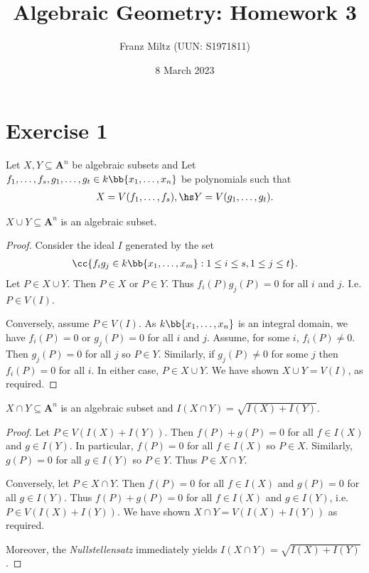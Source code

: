 \documentclass{article}
\begin{document}
\title{Algebraic Geometry: Homework 3}
\author{Franz Miltz (UUN: S1971811)}
\date{8 March 2023}
\maketitle

\section*{Exercise 1}

Let $X,Y\subseteq\mathbf A^n$ be algebraic subsets and
Let $f_1,\ldots,f_s,g_1,\ldots,g_t\in k\bb{x_1,\ldots,x_n}$ be polynomials such that
\begin{align*}
  X=V(f_1,\ldots,f_s), \hs
  Y=V(g_1,\ldots,g_t).
\end{align*}

\begin{claim*}[1]
  $X\cup Y\subseteq \mathbf A^n$ is an algebraic subset.
  \begin{proof}
    Consider the ideal $I$ generated by the set
    \begin{align*}
      \cc{f_i g_j \in k\bb{x_1,\ldots,x_m} : 1\leq i\leq s, 1\leq j\leq t}.
    \end{align*}
    Let $P\in X\cup Y$. Then $P\in X$ or $P\in Y$. Thus $f_i(P)g_j(P)=0$ for all
    $i$ and $j$. I.e. $P\in V(I)$.

    Conversely, assume $P\in V(I)$. As $k\bb{x_1,\ldots,x_n}$ is an integral domain,
    we have $f_i(P)=0$ or $g_j(P)=0$ for all $i$ and $j$. Assume, for some $i$,
    $f_i(P)\neq 0$. Then $g_j(P)=0$ for all $j$ so $P\in Y$. Similarly, if $g_j(P)\neq 0$
    for some $j$ then $f_i(P)=0$ for all $i$. In either case, $P\in X\cup Y$. We
    have shown $X\cup Y=V(I)$, as required.
  \end{proof}
\end{claim*}

\begin{claim*}[2]
  $X\cap Y\subseteq\mathbf A^n$ is an algebraic subset and
  $I(X\cap Y)=\sqrt{I(X)+I(Y)}$.
  \begin{proof}
    Let $P\in V(I(X)+I(Y))$. Then $f(P)+g(P)=0$ for all $f\in I(X)$ and $g\in I(Y)$.
    In particular, $f(P)=0$ for all $f\in I(X)$ so $P\in X$. Similarly, $g(P)=0$ for
    all $g\in I(Y)$ so $P\in Y$. Thus $P\in X\cap Y$.

    Conversely, let $P\in X\cap Y$. Then $f(P)=0$ for all $f\in I(X)$ and
    $g(P)=0$ for all $g\in I(Y)$. Thus $f(P)+g(P)=0$ for all $f\in I(X)$ and
    $g\in I(Y)$, i.e. $P\in V(I(X)+I(Y))$. We have shown $X\cap Y=V(I(X)+I(Y))$
    as required.

    Moreover, the \emph{Nullstellensatz} immediately yields $I(X\cap Y)=\sqrt{I(X) + I(Y)}$.
  \end{proof}
\end{claim*}
\end{document}
